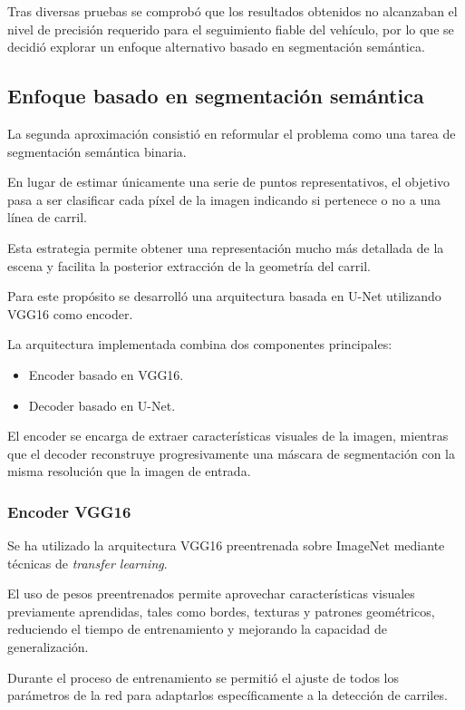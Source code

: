 \documentclass[12pt, a4paper]{article}
\begin{document}
Tras diversas pruebas se comprobó que los resultados obtenidos no alcanzaban el nivel de precisión requerido para el seguimiento fiable del vehículo, por lo que se decidió explorar un enfoque alternativo basado en segmentación semántica.

\subsection{Enfoque basado en segmentación semántica}

La segunda aproximación consistió en reformular el problema como una tarea de segmentación semántica binaria.

En lugar de estimar únicamente una serie de puntos representativos, el objetivo pasa a ser clasificar cada píxel de la imagen indicando si pertenece o no a una línea de carril.

Esta estrategia permite obtener una representación mucho más detallada de la escena y facilita la posterior extracción de la geometría del carril.

Para este propósito se desarrolló una arquitectura basada en U-Net utilizando VGG16 como encoder. 

La arquitectura implementada combina dos componentes principales:

\begin{itemize}
    \item Encoder basado en VGG16.
    \item Decoder basado en U-Net.
\end{itemize}

El encoder se encarga de extraer características visuales de la imagen, mientras que el decoder reconstruye progresivamente una máscara de segmentación con la misma resolución que la imagen de entrada.

\subsubsection{Encoder VGG16}
Se ha utilizado la arquitectura VGG16 preentrenada sobre ImageNet mediante técnicas de \textit{transfer learning}.

El uso de pesos preentrenados permite aprovechar características visuales previamente aprendidas, tales como bordes, texturas y patrones geométricos, reduciendo el tiempo de entrenamiento y mejorando la capacidad de generalización.

Durante el proceso de entrenamiento se permitió el ajuste de todos los parámetros de la red para adaptarlos específicamente a la detección de carriles.
\end{document}
